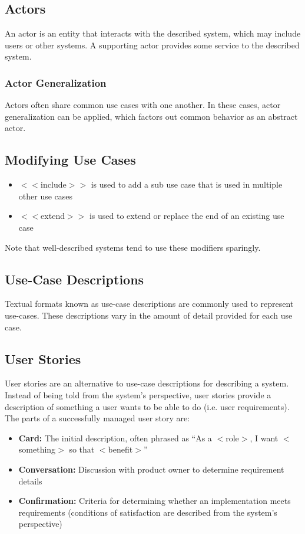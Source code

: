 \documentclass[12pt,titlepage]{article}
\begin{document}
      \subsection{Actors}
        An actor is an entity that interacts with the described system, which may include users or other systems. A supporting actor provides some service to the
        described system.

        \subsubsection{Actor Generalization}
          Actors often share common use cases with one another. In these cases, actor generalization can be applied, which factors out common behavior as an
          abstract actor.

      \subsection{Modifying Use Cases}
        \begin{itemize}
          \item $<<$include$>>$ is used to add a sub use case that is used in multiple other use cases
          \item $<<$extend$>>$ is used to extend or replace the end of an existing use case
        \end{itemize}
        Note that well-described systems tend to use these modifiers sparingly.

      \subsection{Use-Case Descriptions}
        Textual formats known as use-case descriptions are commonly used to represent use-cases. These descriptions vary in the amount of detail provided for
        each use case.

      \subsection{User Stories}
        User stories are an alternative to use-case descriptions for describing a system. Instead of being told from the system's perspective, user stories
        provide a description of something a user wants to be able to do (i.e. user requirements). The parts of a successfully managed user story are:
        \begin{itemize}
          \item \textbf{Card:} The initial description, often phrased as ``As a $<$role$>$, I want $<$something$>$ so that $<$benefit$>$''
          \item \textbf{Conversation:} Discussion with product owner to determine requirement details
          \item \textbf{Confirmation:} Criteria for determining whether an implementation meets requirements (conditions of satisfaction are described
          from the system's perspective)
        \end{itemize}
\end{document}
